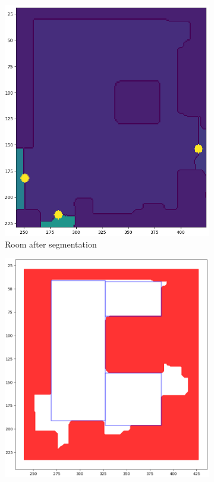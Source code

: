 \begin{figure}[h]
    \captionsetup[subfigure]{justification=centering}
    \centering
    \begin{subfigure}{.31\textwidth}
      \centering
      \includegraphics[width=\textwidth]{figures/50_implementation/ryu_room2_clean.png}
      \caption{Room after segmentation}
    \end{subfigure}%
    \begin{subfigure}{.33\textwidth}
      \centering
      \includegraphics[width=\textwidth]{figures/50_implementation/ryu_room2_rectangles.png}

\end{subfigure}
\end{figure}
